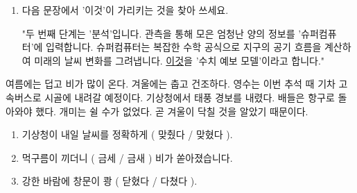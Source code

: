 \documentclass[fs11,seriesFre]{korfarm-base}
\begin{document}
\kfActivityBg {}
\par{}\par\nopagebreak[4]\smallskip\nopagebreak[4]
\begin{enumerate}[leftmargin=22pt, itemsep=6pt, topsep=4pt, label=\textbf{\arabic*.}]
\item 다음 문장에서 '이것'이 가리키는 것을 찾아 쓰세요.
\begin{kfEvidence}"두 번째 단계는 '분석'입니다. 관측을 통해 모은 엄청난 양의 정보를 '슈퍼컴퓨터'에 입력합니다. 슈퍼컴퓨터는 복잡한 수학 공식으로 지구의 공기 흐름을 계산하여 미래의 날씨 변화를 그려냅니다. \uline{이것}을 '수치 예보 모델'이라고 합니다."\end{kfEvidence}
\end{enumerate}

\kfActivityBg \par{}\par\nopagebreak[4]\smallskip\nopagebreak[4]
\begin{kfBlankList}
\kfBlankItem 여름에는 덥고 비가 많이 온다. \kfFillBlank[12mm]{} 겨울에는 춥고 건조하다.
\kfBlankItem 영수는 이번 추석 때 기차 \kfFillBlank[12mm]{} 고속버스로 시골에 내려갈 예정이다.
\kfBlankItem 기상청에서 태풍 경보를 내렸다. \kfFillBlank[12mm]{} 배들은 항구로 돌아와야 했다.
\kfBlankItem 개미는 쉴 수가 없었다. \kfFillBlank[12mm]{} 곧 겨울이 닥칠 것을 알았기 때문이다.
\end{kfBlankList}

\kfActivityBg {}
\par{}\par\nopagebreak[4]\smallskip\nopagebreak[4]
\begin{enumerate}[leftmargin=22pt, itemsep=6pt, topsep=4pt, label=\textbf{\arabic*.}]
\item 기상청이 내일 날씨를 정확하게 ( 맞췄다 / 맞혔다 ).
\item 먹구름이 끼더니 ( 금세 / 금새 ) 비가 쏟아졌습니다.
\item 강한 바람에 창문이 쾅 ( 닫혔다 / 다쳤다 ).
\end{enumerate}
\end{document}
